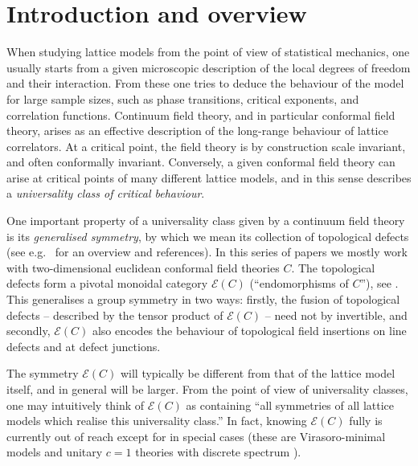 \documentclass[11pt,a4paper]{article}
\numberwithin{equation}{section}
\begin{document}
\newpage
\setcounter{tocdepth}{2}
\tableofcontents

\newpage

\section{Introduction and overview}

When studying lattice models from the point of view of statistical mechanics, one usually starts from a given microscopic description of the local degrees of freedom and their interaction. From these one tries to deduce the behaviour of the model for large sample sizes, such as phase transitions, critical exponents, and correlation functions. Continuum field theory, and in particular conformal field theory, arises as an effective description of the long-range behaviour of lattice correlators. At a critical point, the field theory is by construction scale invariant, and often conformally invariant. Conversely, a given conformal field theory can arise at critical points of many different lattice models, and in this sense describes a \emph{universality class of critical behaviour}.

One important property of a universality class given by a continuum field theory is its \emph{generalised symmetry}, by which we mean its collection of topological defects (see e.g.\ \cite{Carqueville:2023jhb} for an overview and references). In this series of papers we mostly work with two-dimensional euclidean conformal field theories $C$. The topological defects form a pivotal monoidal category $\mathcal{E}(C)$ (``endomorphisms of $C$''), see \cite{Fuchs:2002cm,Frohlich:2006ch,Davydov:2011kb,Carqueville:2012dk,Bhardwaj:2017xup,Chang:2018iay,Thorngren:2021yso}. This generalises a group symmetry in two ways: firstly, the fusion of topological defects -- described by the tensor product of $\mathcal{E}(C)$ -- need not by invertible, and secondly, $\mathcal{E}(C)$ also encodes the behaviour of topological field insertions on line defects and at defect junctions.

The symmetry $\mathcal{E}(C)$ will typically be different from that of the lattice model itself, and in general will be larger. From the point of view of universality classes, one may intuitively think of $\mathcal{E}(C)$ as containing ``all symmetries of all lattice models which realise this universality class.''
In fact, knowing $\mathcal{E}(C)$ fully is currently out of reach except for in special cases (these are Virasoro-minimal models \cite{Petkova:2000ip,Fuchs:2002cm} and unitary $c=1$ theories with discrete spectrum \cite{Fuchs:2007tx,Thorngren:2021yso}). 
\end{document}

